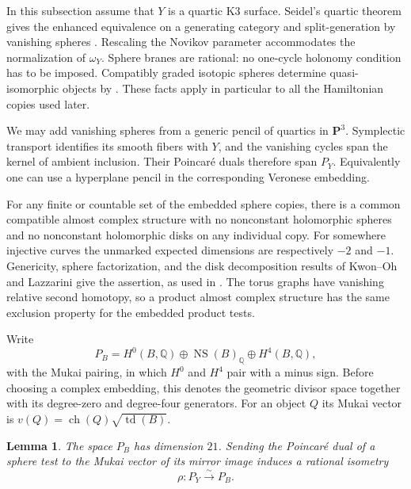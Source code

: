 \documentclass[11pt]{article}
\numberwithin{equation}{section}
\newtheorem{lemma}[theorem]{Lemma}
\theoremstyle{definition}
\theoremstyle{remark}
\begin{document}
In this subsection assume that $Y$ is a quartic K3 surface.
Seidel's quartic theorem gives the enhanced equivalence on a generating
category and split-generation by vanishing spheres
\cite[Theorem~1.3, Corollary~9.6, and Lemma~11.4]{SeidelQuartic}.
Rescaling the Novikov parameter accommodates the normalization of
$\omega_Y$.  Sphere branes are rational: no one-cycle holonomy condition
has to be imposed.  Compatibly graded isotopic spheres determine
quasi-isomorphic objects by \cite[Lemma~8.14]{SeidelQuartic}.  These facts
apply in particular to all the Hamiltonian copies used later.

We may add vanishing spheres from a generic pencil of quartics in
$\mathbf P^3$.  Symplectic transport identifies its smooth fibers with
$Y$, and the vanishing cycles span the kernel of ambient inclusion.
Their Poincar\'e duals therefore span $P_Y$.  Equivalently one can use
a hyperplane pencil in the corresponding Veronese embedding.

For any finite or countable set of the embedded sphere copies, there is
a common compatible almost complex structure with no nonconstant
holomorphic spheres and no nonconstant holomorphic disks on any
individual copy.  For somewhere injective curves the unmarked expected
dimensions are respectively $-2$ and $-1$.  Genericity, sphere
factorization, and the disk decomposition results of Kwon--Oh and
Lazzarini \cite{KwonOh,Lazzarini} give the assertion, as used in
\cite[Section~8]{SeidelQuartic}.  The torus graphs have vanishing relative
second homotopy, so a product almost complex structure has the same
exclusion property for the embedded product tests.

Write
\begin{equation}
 P_B=H^0(B,\mathbb Q)\oplus\operatorname{NS}(B)_{\mathbb Q}\oplus H^4(B,\mathbb Q),
 \label{setup:algebraic-mukai}
\end{equation}
with the Mukai pairing, in which $H^0$ and $H^4$ pair with a minus sign.
Before choosing a complex embedding, this denotes the geometric divisor
space together with its degree-zero and degree-four generators.
For an object $Q$ its Mukai vector is
$v(Q)=\operatorname{ch}(Q)\sqrt{\operatorname{td}(B)}$.

\begin{lemma}
\label{setup:rho-lemma}
The space $P_B$ has dimension $21$.  Sending the Poincar\'e dual of a
sphere test to the Mukai vector of its mirror image induces a rational
isometry
\begin{equation}
 \rho:P_Y\xrightarrow{\sim}P_B.
 \label{setup:rho}
\end{equation}
\end{lemma}
\end{document}
